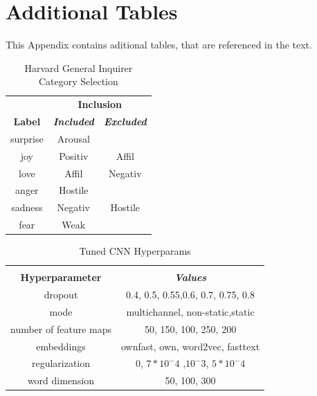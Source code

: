 \documentclass[conference]{IEEEtran}
\begin{document}
\appendices
\section{Additional Tables}
\label{FirstAppendix}

This Appendix contains aditional tables, that are referenced in the text.

\begin{table}[htbp]
\caption{Harvard General Inquirer Category Selection}
\begin{center}
\begin{tabular}{|c|c|c|}
\hline
\textbf{}&\multicolumn{2}{|c|}{\textbf{Inclusion}} \\ 
\cline{2-3}
\textbf{Label} & \textbf{\textit{Included}}& \textbf{\textit{Excluded}} \\
\hline
surprise & Arousal & \\
\hline
joy & Positiv & Affil \\
\hline
love & Affil & Negativ\\
\hline
anger & Hostile & \\
\hline
sadness & Negativ & Hostile\\
\hline
fear & Weak & \\
\hline
\end{tabular}
\label{taba3}
\end{center}
\end{table}

\begin{table}[htbp]
\caption{Tuned CNN Hyperparams}
\begin{center}
\begin{tabular}{|c|c|}
\hline
\textbf{}&\multicolumn{1}{|c|}{\textbf{}} \\ 
\cline{2-2}
\textbf{Hyperparameter} & \textbf{\textit{Values}} \\ 
\hline
dropout & 0.4, 0.5, 0.55,0.6, 0.7,  0.75, 0.8\\ 
\hline
mode & multichannel, non-static,static \\ 
\hline
number of feature maps & 50, 150, 100, 250, 200 \\ 
\hline
embeddings & ownfast, own, word2vec, fasttext \\ 
\hline
regularization & 0, $7*10^-4$ ,$10^-3$, $5*10^-4$ \\ 
\hline
word dimension & 50, 100, 300 \\ 
\hline
\end{tabular}
\label{tabahp}
\end{center}
\end{table}
\end{document}
